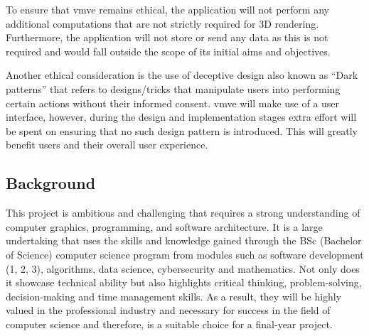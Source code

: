 \documentclass[11pt]{article}
\begin{document}
To ensure that \gls*{vmve} remains ethical, the application will not perform any
additional computations that are not strictly required for 3D rendering.
Furthermore, the application will not store or send any data as this is not
required and would fall outside the scope of its initial aims and objectives.

Another ethical consideration is the use of deceptive design also known as
``Dark patterns'' that refers to designs/tricks that manipulate users into
performing certain actions without their informed consent. \gls*{vmve} will make
use of a user interface, however, during the design and implementation stages
extra effort will be spent on ensuring that no such design pattern is
introduced. This will greatly benefit users and their overall user experience.

\subsection{Background}
This project is ambitious and challenging that requires a strong understanding
of computer graphics, programming, and software architecture. It is a large
undertaking that uses the skills and knowledge gained through the BSc (Bachelor
of Science) computer science program from modules such as software development
(1, 2, 3), algorithms, data science, cybersecurity and mathematics. Not only
does it showcase technical ability but also highlights critical thinking,
problem-solving, decision-making and time management skills. As a result, they
will be highly valued in the professional industry and necessary for success in
the field of computer science and therefore, is a suitable choice for a
final-year project.
\end{document}
